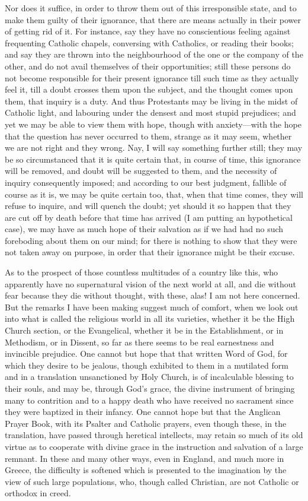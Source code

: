 Nor does it suffice, in order to throw them out of this
irresponsible state, and to make them guilty of their ignorance, that
there are means actually in their power of getting rid of it. For
instance, say they have no conscientious feeling against frequenting
Catholic chapels, conversing with Catholics, or reading their books;
and say they are thrown into the neighbourhood of the one or the
company of the other, and do not avail themselves of their
opportunities; still these persons do not become responsible for their
present ignorance till such time as they actually feel it, till a
doubt crosses them upon the subject, and the thought comes upon them,
that inquiry is a duty. And thus Protestants may be living in the
midst of Catholic light, and labouring under the densest and most
stupid prejudices; and yet we may be able to view them with hope,
though with anxiety—with the hope that the question has never
occurred to them, strange as it may seem, whether we are not right and
they wrong. Nay, I will say something further still; they may be so
circumstanced that it is quite certain that, in course of time, this
ignorance will be removed, and doubt will be suggested to them, and
the necessity of inquiry consequently imposed; and according to our
best judgment, fallible of course as it is, we may be quite certain
too, that, when that time comes, they will refuse to inquire, and will
quench the doubt; yet should it so happen that they are cut off by
death before that time has arrived (I am putting an hypothetical
case), we may have as much hope of their salvation as if we had had no
such foreboding about them on our mind; for there is nothing to show
that they were not taken away on purpose, in order that their
ignorance might be their excuse.

As to the prospect of those countless multitudes of a country like
this, who apparently have no supernatural vision of the next world at
all, and die without fear because they die without thought, with
these, alas! I am not here concerned. But the remarks I have been
making suggest much of comfort, when we look out into what is called
the religious world in all its varieties, whether it be the High
Church section, or the Evangelical, whether it be in the
Establishment, or in Methodism, or in Dissent, so far as there seems
to be real earnestness and invincible prejudice. One cannot but hope
that that written Word of God, for which they desire to be jealous,
though exhibited to them in a mutilated form and in a translation
unsanctioned by Holy Church, is of incalculable blessing to their
souls, and may be, through God's grace, the divine instrument of
bringing many to contrition and to a happy death who have received no
sacrament since they were baptized in their infancy. One cannot hope
but that the Anglican Prayer Book, with its Psalter and Catholic
prayers, even though these, in the translation, have passed through
heretical intellects, may retain so much of its old virtue as to
cooperate with divine grace in the instruction and salvation of a
large remnant. In these and many other ways, even in England, and much
more in Greece, the difficulty is softened which is presented to the
imagination by the view of such large populations, who, though called
Christian, are not Catholic or orthodox in creed.

